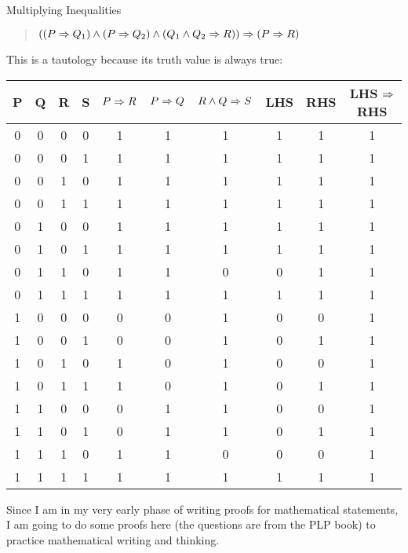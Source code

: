 \begin{example}{Multiplying Inequalities}
	\begin{quote}
		\centering
		$ ((P \Rightarrow Q_1) \wedge (P \Rightarrow Q_2) \wedge (Q_1 \wedge Q_2 \Rightarrow R)) \Rightarrow (P \Rightarrow R) $
	\end{quote}
	This is a tautology because its truth value is always true:
	\begin{center}
		\begin{tabular}{|c|c|c|c|c|c|c|c|c|c|}
			\hline
			P & Q & R & S & $ P \Rightarrow R $ & $ P \Rightarrow Q $ & $ R \wedge Q \Rightarrow S $ & LHS & RHS & LHS $ \Rightarrow $ RHS \\
			\hline
			0 & 0 & 0 & 0 & 1 & 1 & 1 & 1 & 1 & 1 \\
			\hline
			0 & 0 & 0 & 1 & 1 & 1 & 1 & 1 & 1 & 1 \\
			\hline
			0 & 0 & 1 & 0 & 1 & 1 & 1 & 1 & 1 & 1 \\
			\hline
			0 & 0 & 1 & 1 & 1 & 1 & 1 & 1 & 1 & 1 \\
			\hline
			0 & 1 & 0 & 0 & 1 & 1 & 1 & 1 & 1 & 1 \\
			\hline
			0 & 1 & 0 & 1 & 1 & 1 & 1 & 1 & 1 & 1 \\
			\hline
			0 & 1 & 1 & 0 & 1 & 1 & 0 & 0 & 1 & 1 \\
			\hline
			0 & 1 & 1 & 1 & 1 & 1 & 1 & 1 & 1 & 1 \\
			\hline
			1 & 0 & 0 & 0 & 0 & 0 & 1 & 0 & 0 & 1 \\
			\hline
			1 & 0 & 0 & 1 & 0 & 0 & 1 & 0 & 1 & 1 \\
			\hline
			1 & 0 & 1 & 0 & 1 & 0 & 1 & 0 & 0 & 1 \\
			\hline
			1 & 0 & 1 & 1 & 1 & 0 & 1 & 0 & 1 & 1 \\
			\hline
			1 & 1 & 0 & 0 & 0 & 1 & 1 & 0 & 0 & 1 \\
			\hline
			1 & 1 & 0 & 1 & 0 & 1 & 1 & 0 & 1 & 1 \\
			\hline
			1 & 1 & 1 & 0 & 1 & 1 & 0 & 0 & 0 & 1 \\
			\hline
			1 & 1 & 1 & 1 & 1 & 1 & 1 & 1 & 1 & 1 \\
			\hline
		\end{tabular}
	\end{center}
	
\end{example}


Since I am in my very early phase of writing proofs for mathematical statements, I am going to do some proofs here (the questions are from the PLP book) to practice mathematical writing and thinking.


